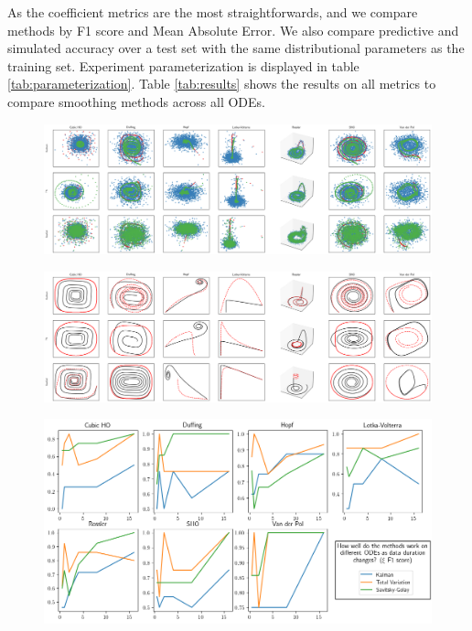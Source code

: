 \documentclass{article}
\begin{document}
\begin{table}
    \label{tab:parameterization}
\end{table}
As the coefficient metrics are the most straightforwards, and we compare methods by F1 score and Mean Absolute Error.  We also compare predictive and simulated accuracy over a test set with the same distributional parameters as the training set.  Experiment parameterization is displayed in table \ref{tab:parameterization}.  Table \ref{tab:results} shows the results on all metrics to compare smoothing methods across all ODEs.
\begin{table}
    \label{tab:results}
\end{table}


\begin{figure}
    \includegraphics[height=\pdfpageheight]{images/summary_train}
\end{figure}
\begin{figure}
    \includegraphics[height=\pdfpageheight]{images/summary_test}
\end{figure}
\begin{figure}
    \includegraphics[width=\textwidth]{images/summary_f1}
\end{figure}
\end{document}
